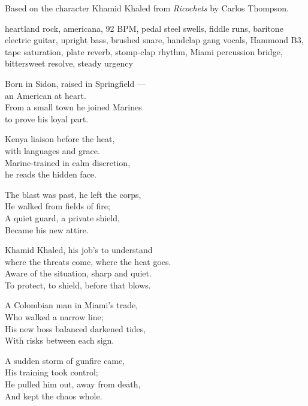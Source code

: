 
\label{sec:before-that-blows}
\begin{notes}
Based on the character Khamid Khaled from \emph{Ricochets} by Carlos Thompson.
\end{notes}
\begin{style}
heartland rock, americana, 92 BPM, pedal steel swells, fiddle runs, baritone electric guitar, upright bass, brushed snare, handclap gang vocals, Hammond B3, tape saturation, plate reverb, stomp-clap rhythm, Miami percussion bridge, bittersweet resolve, steady urgency
\end{style}
\begin{lyrics}
Born in Sidon, raised in Springfield —\\
an American at heart.\\
From a small town he joined Marines\\
to prove his loyal part.

Kenya liaison before the heat,\\
with languages and grace.\\
Marine-trained in calm discretion,\\
he reads the hidden face.

The blast was past, he left the corps,\\
He walked from fields of fire;\\
A quiet guard, a private shield,\\
Became his new attire.

Khamid Khaled, his job's to understand\\
where the threats come, where the heat goes.\\
Aware of the situation, sharp and quiet.\\
To protect, to shield, before that blows.

A Colombian man in Miami’s trade,\\
Who walked a narrow line;\\
His new boss balanced darkened tides,\\
With risks between each sign.

A sudden storm of gunfire came,\\
His training took control;\\
He pulled him out, away from death,\\
And kept the chaos whole.


\end{lyrics}
